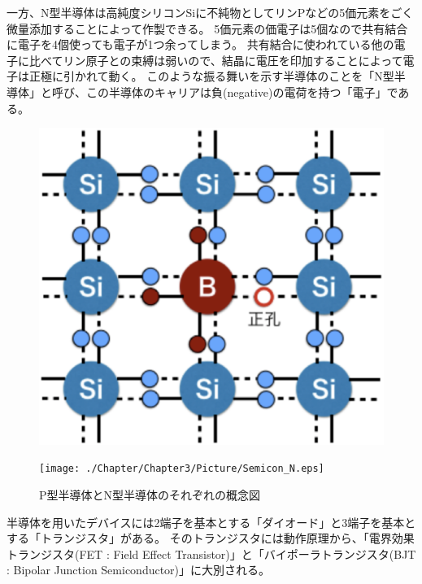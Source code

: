 		一方、N型半導体は高純度シリコンSiに不純物としてリンPなどの5価元素をごく微量添加することによって作製できる。
		5価元素の価電子は5個なので共有結合に電子を4個使っても電子が1つ余ってしまう。
		共有結合に使われている他の電子に比べてリン原子との束縛は弱いので、結晶に電圧を印加することによって電子は正極に引かれて動く。
		このような振る舞いを示す半導体のことを「N型半導体」と呼び、この半導体のキャリアは負(negative)の電荷を持つ「電子」である。
		\begin{figure}[hbtp]
  			\begin{minipage}[b]{0.45\linewidth}
    				\centering
    				\includegraphics[keepaspectratio, scale=0.2]{./Chapter/Chapter3/Picture/Semicon_P.eps}
				\label{fig:Semicon_P}
  			\end{minipage}
  			\begin{minipage}[b]{0.45\linewidth}
    				\centering
    				\texttt{[image: ./Chapter/Chapter3/Picture/Semicon\_N.eps]}
				\label{fig:Semicon_N}
  			\end{minipage}
 			\caption{P型半導体とN型半導体のそれぞれの概念図}
			\label{fig:Semicon_PN}
		\end{figure}
		
		半導体を用いたデバイスには2端子を基本とする「ダイオード」と3端子を基本とする「トランジスタ」がある。
		そのトランジスタには動作原理から、「電界効果トランジスタ(FET : Field Effect Transistor)」と「バイポーラトランジスタ(BJT : Bipolar Junction Semiconductor)」に大別される。
		
